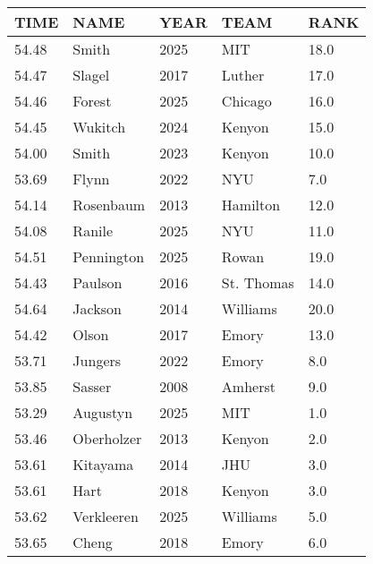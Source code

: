 \begin{table}[H]
\begin{minipage}[t]{0.48\textwidth}
\begin{tabular}{@{}p{1.8cm}p{2.8cm}p{1.2cm}p{1.4cm}p{0.8cm}@{}}
\hline
    \textbf{TIME} & \textbf{NAME} & \textbf{YEAR} & \textbf{TEAM} & \textbf{RANK} \\
\hline
    54.48 & Smith & 2025 & MIT & 18.0 \\
    54.47 & Slagel & 2017 & Luther & 17.0 \\
    54.46 & Forest & 2025 & Chicago & 16.0 \\
    54.45 & Wukitch & 2024 & Kenyon & 15.0 \\
    54.00 & Smith & 2023 & Kenyon & 10.0 \\
    53.69 & Flynn & 2022 & NYU & 7.0 \\
    54.14 & Rosenbaum & 2013 & Hamilton & 12.0 \\
    54.08 & Ranile & 2025 & NYU & 11.0 \\
    54.51 & Pennington & 2025 & Rowan & 19.0 \\
    54.43 & Paulson & 2016 & St. Thomas & 14.0 \\
    54.64 & Jackson & 2014 & Williams & 20.0 \\
    54.42 & Olson & 2017 & Emory & 13.0 \\
    53.71 & Jungers & 2022 & Emory & 8.0 \\
    53.85 & Sasser & 2008 & Amherst & 9.0 \\
    53.29 & Augustyn & 2025 & MIT & 1.0 \\
    53.46 & Oberholzer & 2013 & Kenyon & 2.0 \\
    53.61 & Kitayama & 2014 & JHU & 3.0 \\
    53.61 & Hart & 2018 & Kenyon & 3.0 \\
    53.62 & Verkleeren & 2025 & Williams & 5.0 \\
    53.65 & Cheng & 2018 & Emory & 6.0 \\
\hline
\end{tabular}
\end{minipage}
\end{table}

